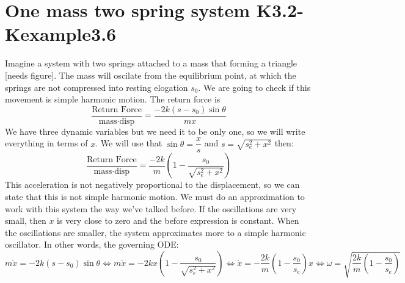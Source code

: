 \documentclass{report}
\begin{document}
      \section{One mass two spring system K3.2-Kexample3.6}
          \noindent Imagine a system with two springs attached to a mass that forming a triangle [needs figure]. The mass will oscilate from the equilibrium point, at which the springs are not compressed into resting elogation $s_0$. We are going to check if this movement is simple harmonic motion. The return force is
          \[\dfrac{\text{Return Force}}{\text{mass}\cdot\text{disp}} = \dfrac{-2k(s-s_0)\sin\theta}{mx}\]
          \noindent We have three dynamic variables but we need it to be only one, so we will write everything in terms of $x$. We will use that $\sin\theta=\dfrac{x}{s}$ and $s=\sqrt{s_e^2+x^2}$ then:
          \[\dfrac{\text{Return Force}}{\text{mass}\cdot\text{disp}} = \dfrac{-2k}{m}\left(1-\dfrac{s_0}{\sqrt{s_e^2+x^2}}\right)\]
          \noindent This acceleration is not negatively proportional to the displacement, so we can state that this is not simple harmonic motion. We must do an approximation to work with this system the way we've talked before. If the oscillations are very small, then $x$ is very close to zero and the before expression is constant. When the oscillations are smaller, the system approximates more to a simple harmonic oscillator. In other words, the governing ODE:
          \[m\ddot{x}=-2k(s-s_0)\sin\theta\Longleftrightarrow m\ddot{x}=-2kx\left(1-\dfrac{s_0}{\sqrt{s_e^2+x^2}}\right)\Longleftrightarrow \ddot{x}=-\dfrac{2k}{m}\left(1-\dfrac{s_0}{s_e}\right)x\Longleftrightarrow\boxed{\omega=\sqrt{\dfrac{2k}{m}\left(1-\dfrac{s_0}{s_e}\right)}}\]
          
\end{document}
